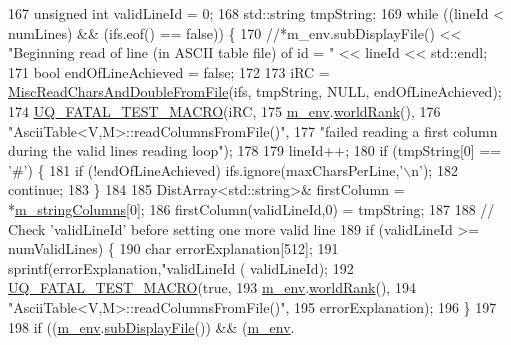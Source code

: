 \begin{DoxyCode}
{167   \textcolor{keywordtype}{unsigned} \textcolor{keywordtype}{int} validLineId = 0;
168   std::string tmpString;
169   \textcolor{keywordflow}{while} ((lineId < numLines) && (ifs.eof() == \textcolor{keyword}{false})) \{
170     \textcolor{comment}{//*m\_env.subDisplayFile() << "Beginning read of line (in ASCII table file) of id = " << lineId <<
       std::endl;}
171     \textcolor{keywordtype}{bool} endOfLineAchieved = \textcolor{keyword}{false};
172 
173     iRC = \hyperlink{namespace_q_u_e_s_o_a575d3153d82b7df3d78ad5cfbf2b83b7}{MiscReadCharsAndDoubleFromFile}(ifs, tmpString, NULL, 
      endOfLineAchieved);
174     \hyperlink{_defines_8h_a56d63d18d0a6d45757de47fcc06f574d}{UQ\_FATAL\_TEST\_MACRO}(iRC,
175                         \hyperlink{class_q_u_e_s_o_1_1_ascii_table_a2ba907db652aa02d53d493980d7a3753}{m\_env}.\hyperlink{class_q_u_e_s_o_1_1_base_environment_a78b57112bbd0e6dd0e8afec00b40ffa7}{worldRank}(),
176                         \textcolor{stringliteral}{"AsciiTable<V,M>::readColumnsFromFile()"},
177                         \textcolor{stringliteral}{"failed reading a first column during the valid lines reading loop"});
178 
179     lineId++;
180     \textcolor{keywordflow}{if} (tmpString[0] == \textcolor{charliteral}{'#'}) \{
181       \textcolor{keywordflow}{if} (!endOfLineAchieved) ifs.ignore(maxCharsPerLine,\textcolor{charliteral}{'\(\backslash\)n'});
182       \textcolor{keywordflow}{continue};
183     \}
184 
185     DistArray<std::string>& firstColumn = *\hyperlink{class_q_u_e_s_o_1_1_ascii_table_a14ba55d29e9a4ddeb14cd5acd8a27268}{m\_stringColumns}[0];
186     firstColumn(validLineId,0) = tmpString;
187 
188     \textcolor{comment}{// Check 'validLineId' before setting one more valid line}
189     \textcolor{keywordflow}{if} (validLineId >= numValidLines) \{
190       \textcolor{keywordtype}{char} errorExplanation[512];
191       sprintf(errorExplanation,\textcolor{stringliteral}{"validLineId (%
      validLineId);
192       \hyperlink{_defines_8h_a56d63d18d0a6d45757de47fcc06f574d}{UQ\_FATAL\_TEST\_MACRO}(\textcolor{keyword}{true},
193                           \hyperlink{class_q_u_e_s_o_1_1_ascii_table_a2ba907db652aa02d53d493980d7a3753}{m\_env}.\hyperlink{class_q_u_e_s_o_1_1_base_environment_a78b57112bbd0e6dd0e8afec00b40ffa7}{worldRank}(),
194                           \textcolor{stringliteral}{"AsciiTable<V,M>::readColumnsFromFile()"},
195                           errorExplanation);
196     \}
197 
198     \textcolor{keywordflow}{if} ((\hyperlink{class_q_u_e_s_o_1_1_ascii_table_a2ba907db652aa02d53d493980d7a3753}{m\_env}.\hyperlink{class_q_u_e_s_o_1_1_base_environment_a8a0064746ae8dddfece4229b9ad374d6}{subDisplayFile}()) && (\hyperlink{class_q_u_e_s_o_1_1_ascii_table_a2ba907db652aa02d53d493980d7a3753}{m\_env}.
}}
\end{DoxyCode}
